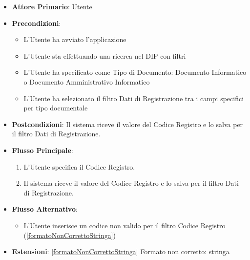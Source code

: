 \begin{itemize}
      \item \textbf{Attore Primario}: Utente
      \item \textbf{Precondizioni}: 
      \begin{itemize}            
            \item L'Utente ha avviato l'applicazione
            \item L'Utente sta effettuando una ricerca nel DIP con filtri
            \item L'Utente ha specificato come Tipo di Documento: Documento Informatico o Documento Amministrativo Informatico
            \item L'Utente ha selezionato il filtro Dati di Registrazione tra i campi specifici per tipo documentale
      \end{itemize}
      \item \textbf{Postcondizioni}: Il sistema riceve il valore del Codice Registro e lo salva per il filtro Dati di Registrazione.
      \item \textbf{Flusso Principale}:
      \begin{enumerate}
            \item L'Utente specifica il Codice Registro.
            \item Il sistema riceve il valore del Codice Registro e lo salva per il filtro Dati di Registrazione.
      \end{enumerate}
      \item \textbf{Flusso Alternativo}:
      \begin{itemize}
            \item L'Utente inserisce un codice non valido per il filtro Codice Registro (\ref{formatoNonCorrettoStringa})
      \end{itemize}
      \item \textbf{Estensioni}: \ref{formatoNonCorrettoStringa} Formato non corretto: stringa
\end{itemize}

